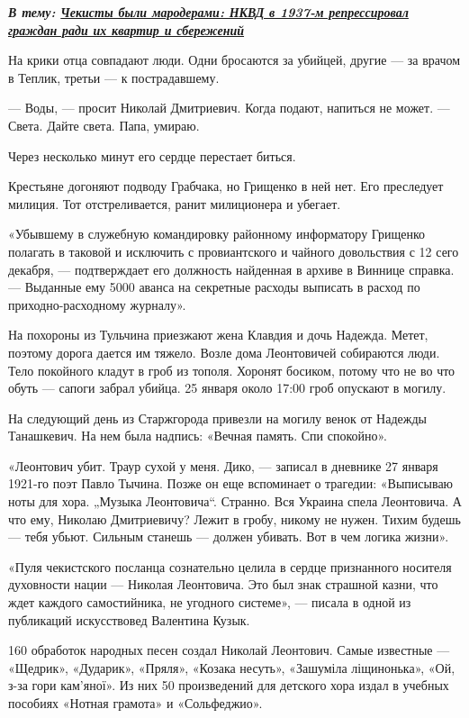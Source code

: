 \begin{leftbar}
  \begingroup
    \em\Large\bfseries\color{blue}
				В тему: \href{http://argumentua.com/stati/chekisty-byli-maroderami-nkvd-v-1937-m-repressiroval-grazhdan-radi-ikh-kvartir-i-sberezhenii}{Чекисты были мародерами: НКВД в 1937-м репрессировал граждан ради их квартир и сбережений}
  \endgroup
\end{leftbar}

На крики отца совпадают люди. Одни бросаются за убийцей, другие — за врачом в
Теплик, третьи — к пострадавшему.

— Воды, — просит Николай Дмитриевич. Когда подают, напиться не может. — Света.
Дайте света. Папа, умираю.

Через несколько минут его сердце перестает биться.

Крестьяне догоняют подводу Грабчака, но Грищенко в ней нет. Его преследует
милиция. Тот отстреливается, ранит милиционера и убегает.

«Убывшему в служебную командировку районному информатору Грищенко полагать в
таковой и исключить с провиантского и чайного довольствия с 12 сего декабря, —
подтверждает его должность найденная в архиве в Виннице справка. — Выданные ему
5000 аванса на секретные расходы выписать в расход по приходно-расходному
журналу».

На похороны из Тульчина приезжают жена Клавдия и дочь Надежда. Метет, поэтому
дорога дается им тяжело. Возле дома Леонтовичей собираются люди. Тело покойного
кладут в гроб из тополя. Хоронят босиком, потому что не во что обуть — сапоги
забрал убийца. 25 января около 17:00 гроб опускают в могилу.

На следующий день из Старжгорода привезли на могилу венок от Надежды
Танашкевич. На нем была надпись: «Вечная память. Спи спокойно».

«Леонтович убит. Траур сухой у меня. Дико, — записал в дневнике 27 января
1921-го поэт Павло Тычина. Позже он еще вспоминает о трагедии: «Выписываю ноты
для хора. „Музыка Леонтовича“. Странно. Вся Украина спела Леонтовича. А что
ему, Николаю Дмитриевичу? Лежит в гробу, никому не нужен. Тихим будешь — тебя
убьют. Сильным станешь — должен убивать. Вот в чем логика жизни».

«Пуля чекистского посланца сознательно целила в сердце признанного носителя
духовности нации — Николая Леонтовича. Это был знак страшной казни, что ждет
каждого самостийника, не угодного системе», — писала в одной из публикаций
искусствовед Валентина Кузык.

160 обработок народных песен создал Николай Леонтович. Самые известные —
«Щедрик», «Дударик», «Пряля», «Козака несуть», «Зашуміла ліщинонька», «Ой, з-за
гори кам'яної». Из них 50 произведений для детского хора издал в учебных
пособиях «Нотная грамота» и «Сольфеджио».

